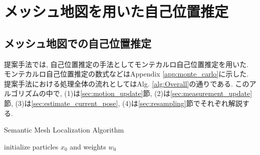 \chapter{メッシュ地図を用いた自己位置推定}

\section{メッシュ地図での自己位置推定}
提案手法では, 自己位置推定の手法としてモンテカルロ自己位置推定\cite{MCL_paper}を用いた. モンテカルロ自己位置推定の数式などはAppendix \ref{app:monte_carlo}に示した. 提案手法における処理全体の流れとしてはAlg. \ref{alg:Overall}の通りである. このアルゴリズムの中で, (1)は\ref{sec:motion_update}節, (2)は\ref{sec:measurement_update}節, (3)は\ref{sec:estimate_current_pose}, (4)は\ref{sec:resampling}節でそれぞれ解説する.

\begin{algorithm}[htpb]
\SetAlgoLined
\caption{Semantic Mesh Localization Algorithm}
\label{alg:Overall}
 initialize particles $x_{0}$ and weights $w_{0}$\;
\end{algorithm}

